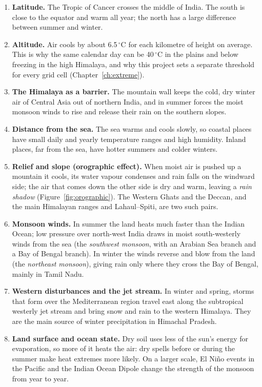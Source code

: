 \begin{enumerate}
\item \textbf{Latitude.} The Tropic of Cancer crosses the middle of India. The south is close to the equator and warm
all year; the north has a large difference between summer and winter.
\item \textbf{Altitude.} Air cools by about 6.5\,$^\circ$C for each kilometre of height on average. This is why the
same calendar day can be 40\,$^\circ$C in the plains and below freezing in the high Himalaya, and why this project
sets a separate threshold for every grid cell (Chapter~\ref{ch:extreme}).
\item \textbf{The Himalaya as a barrier.} The mountain wall keeps the cold, dry winter air of Central Asia out of
northern India, and in summer forces the moist monsoon winds to rise and release their rain on the southern slopes.
\item \textbf{Distance from the sea.} The sea warms and cools slowly, so coastal places have small daily and yearly
temperature ranges and high humidity. Inland places, far from the sea, have hotter summers and colder winters.
\item \textbf{Relief and slope (orographic effect).} When moist air is pushed up a mountain it cools, its water
vapour condenses and rain falls on the windward side; the air that comes down the other side is dry and warm, leaving
a \emph{rain shadow} (Figure~\ref{fig:orographic}). The Western Ghats and the Deccan, and the main Himalayan ranges
and Lahaul--Spiti, are two such pairs.
\item \textbf{Monsoon winds.} In summer the land heats much faster than the Indian Ocean; low pressure over north-west
India draws in moist south-westerly winds from the sea (the \emph{southwest monsoon}, with an Arabian Sea branch and a
Bay of Bengal branch). In winter the winds reverse and blow from the land (the \emph{northeast monsoon}), giving rain
only where they cross the Bay of Bengal, mainly in Tamil Nadu.
\item \textbf{Western disturbances and the jet stream.} In winter and spring, storms that form over the Mediterranean
region travel east along the subtropical westerly jet stream and bring snow and rain to the western Himalaya. They are
the main source of winter precipitation in Himachal Pradesh.
\item \textbf{Land surface and ocean state.} Dry soil uses less of the sun's energy for evaporation, so more of it
heats the air: dry spells before or during the summer make heat extremes more likely. On a larger scale, El Ni\~no
events in the Pacific and the Indian Ocean Dipole change the strength of the monsoon from year to year.
\end{enumerate}

